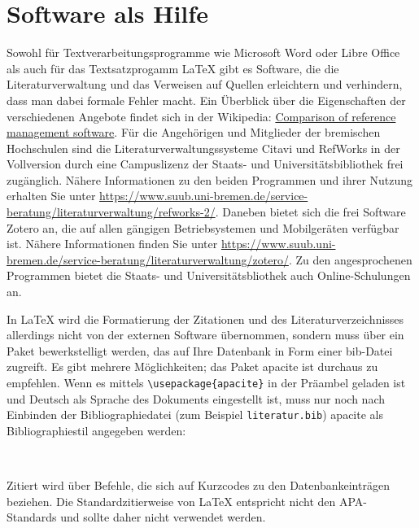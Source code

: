 \documentclass[
  bibliography=totoc,
  oneside,
  12pt,
  a4paper]{scrbook}
\begin{document}
\hypertarget{sec:software}{%
\section{Software als Hilfe}\label{sec:software}}

Sowohl für Textverarbeitungsprogramme wie Microsoft Word oder Libre
Office als auch für das Textsatzprogamm LaTeX gibt es Software, die die
Literaturverwaltung und das Verweisen auf Quellen erleichtern und
verhindern, dass man dabei formale Fehler macht. Ein Überblick über die
Eigenschaften der verschiedenen Angebote findet sich in der Wikipedia:
\href{http://en.wikipedia.org/wiki/Comparison_of_reference_management_software}{Comparison of reference management software}.
Für die Angehörigen und Mitglieder der bremischen Hochschulen sind die
Literaturverwaltungssysteme Citavi und RefWorks in der Vollversion durch
eine Campuslizenz der Staats- und Universitätsbibliothek frei
zugänglich. Nähere Informationen zu den beiden Programmen und ihrer
Nutzung erhalten Sie unter
\url{https://www.suub.uni-bremen.de/service-beratung/literaturverwaltung/refworks-2/}.
Daneben bietet sich die frei Software Zotero an, die auf allen gängigen Betriebsystemen und Mobilgeräten verfügbar ist. Nähere Informationen finden Sie unter \url{https://www.suub.uni-bremen.de/service-beratung/literaturverwaltung/zotero/}. Zu den angesprochenen Programmen bietet die Staats- und Universitätsbliothek auch Online-Schulungen an.

In LaTeX wird die Formatierung der Zitationen und des
Literaturverzeichnisses allerdings nicht von der externen Software übernommen, sondern muss über ein Paket bewerkstelligt werden, das auf Ihre Datenbank in Form einer bib-Datei zugreift. Es gibt mehrere Möglichkeiten; das Paket apacite ist durchaus zu empfehlen. Wenn es mittels \texttt{\textbackslash{}usepackage\{apacite\}} in der Präambel geladen ist und Deutsch als Sprache des Dokuments eingestellt ist, muss nur noch nach Einbinden der Bibliographiedatei (zum Beispiel \texttt{literatur.bib}) apacite als Bibliographiestil angegeben werden:

\begin{verbatim}


\end{verbatim}

Zitiert wird über Befehle, die sich auf Kurzcodes zu den Datenbankeinträgen beziehen. Die Standardzitierweise von LaTeX entspricht nicht den APA-Standards und sollte daher nicht verwendet werden.
\end{document}
